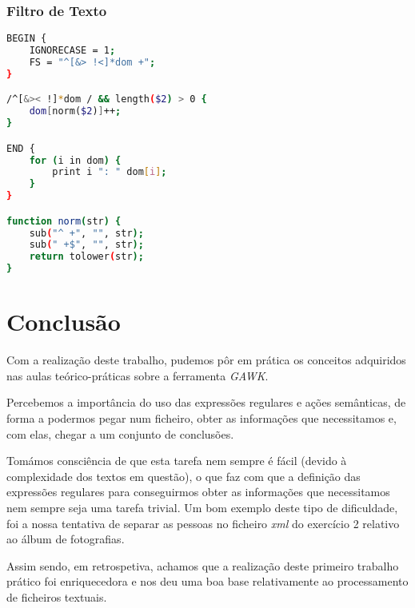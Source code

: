 \documentclass{article}
\begin{document}
\subsubsection{Filtro de Texto}

\begin{lstlisting}[language=bash]
BEGIN {
	IGNORECASE = 1;
	FS = "^[&> !<]*dom +";
}

/^[&>< !]*dom / && length($2) > 0 {
	dom[norm($2)]++;
}

END {
	for (i in dom) {
		print i ": " dom[i];
	}
}

function norm(str) {
	sub("^ +", "", str);
	sub(" +$", "", str);
	return tolower(str);
}

\end{lstlisting}


\section{Conclusão}

Com a realização deste trabalho, pudemos pôr em prática os conceitos adquiridos nas aulas teórico-práticas sobre a ferramenta \emph{GAWK}.

Percebemos a importância do uso das expressões regulares e ações semânticas, de forma a podermos pegar num ficheiro, obter as informações que necessitamos e, com elas, chegar a um conjunto de conclusões.

Tomámos consciência de que esta tarefa nem sempre é fácil (devido à complexidade dos textos em questão), o que faz com que a definição das expressões regulares para conseguirmos obter as informações que necessitamos nem sempre seja uma tarefa trivial. Um bom exemplo deste tipo de dificuldade, foi a nossa tentativa de separar as pessoas no ficheiro \emph{xml} do exercício 2 relativo ao álbum de fotografias.

Assim sendo, em retrospetiva, achamos que a realização deste primeiro trabalho prático foi enriquecedora e nos deu uma boa base relativamente ao processamento de ficheiros textuais.
\end{document}
